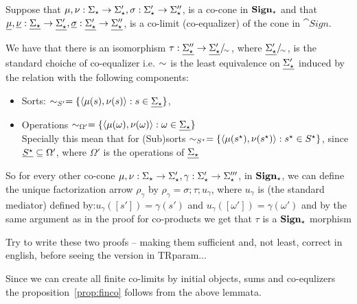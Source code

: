 \begin{PROOF}
Suppose that $\mu,\nu:\Sigma_\star \to \Sigma'_\star, \sigma:\Sigma'_\star
\to \Sigma''_\star$, is a co-cone in ${\bf Sign_\star}$ and that
$\underline{\mu},\underline{\nu}:\underline{\Sigma_\star} \to \underline{\Sigma'_\star},
\underline{\sigma}:\underline{\Sigma'_\star} \to \underline{\Sigma''_\star}$, is a
co-limit (co-equalizer) of the cone in $\cat{Sign}$. 

We have that there is an isomorphism $\tau:\underline{\Sigma''_\star} \to
\underline{\Sigma'_\star}/\!_{\sim_{}}$, where
$\underline{\Sigma'_\star}/\!_{\sim_{}}$, is the standard choiche of
co-equalizer i.e. ${\sim_{}}$ is the least equivalence on
$\underline{\Sigma'_\star}$ induced by the 
relation with the following components:
 \begin{itemize}\MyLPar
\item Sorts: $\sim_{S'}= \{ \langle \mu(s),\nu(s) \rangle: s \in \underline{\Sigma_\star} \}$,
\item Operations $\sim_{\Omega'}= \{ \langle \mu(\omega), \nu(\omega)
\rangle : \omega \in \underline{\Sigma_\star} \}$\\	 
Specially this mean that for (Sub)sorts $\sim_{S^\star}= \{ \langle
\mu(s^\star), \nu(s^\star) \rangle : s^\star \in S^\star \}$, since
$\underline{{S^\star}} \subseteq \Omega'$, where  $\Omega'$ is the operations of
$\underline{\Sigma_\star}$ 
\end{itemize} 
So for every other co-cone $\mu,\nu:\Sigma_\star \to \Sigma'_\star,
\gamma:\Sigma'_\star \to \Sigma'''_\star$, in ${\bf Sign_\star}$, we can
define the unique factorization arrow $\rho_\gamma$ by $\rho_\gamma=
\sigma;\tau;u_\gamma$, where $u_\gamma$ is (the standard mediator) defined
by:$u_\gamma([s'])=\gamma(s')$ and $u_\gamma([\omega'])=\gamma(\omega')$ and
by the same argument as in the proof for co-products we get that $\tau$ is a
${\bf Sign_\star}$ morphism 
\end{PROOF}
{\Large{Try to write these two proofs}} -- making them sufficient and, not
least, correct in english, before seeing the version in TRparam...


Since we can create all finite co-limits by initial objects, sums and
co-equlizers the proposition~\ref{prop:finco} follows from the above lemmata.

